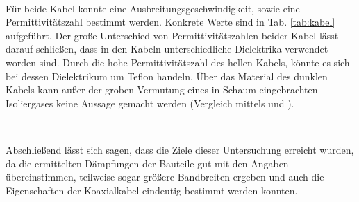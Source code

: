 	\
	
	Für beide Kabel konnte eine Ausbreitungsgeschwindigkeit, sowie eine Permittivitätszahl bestimmt werden.
	Konkrete Werte sind in Tab. \ref{tab:kabel} aufgeführt.
	Der große Unterschied von Permittivitätszahlen beider Kabel lässt darauf schließen, dass in den Kabeln unterschiedliche Dielektrika verwendet worden sind.
	Durch die hohe Permittivitätszahl des hellen Kabels, könnte es sich bei dessen Dielektrikum um Teflon handeln.
	Über das Material des dunklen Kabels kann außer der groben Vermutung eines in Schaum eingebrachten Isoliergases keine Aussage gemacht werden (Vergleich mittels \cite{permit1} und \cite{permit2}).
	
	\
	
	Abschließend lässt sich sagen, dass die Ziele dieser Untersuchung erreicht wurden, da die ermittelten Dämpfungen der Bauteile gut mit den Angaben übereinstimmen, teilweise sogar größere Bandbreiten ergeben und auch die Eigenschaften der Koaxialkabel eindeutig bestimmt werden konnten.
	 
